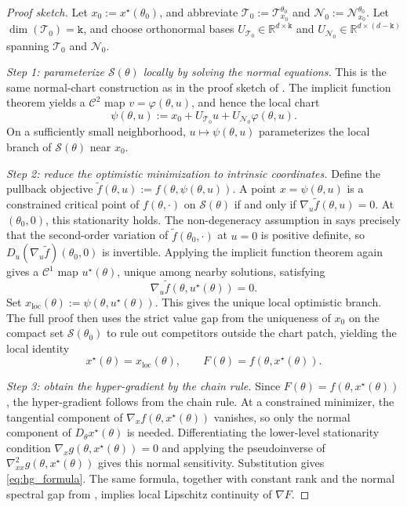 \documentclass{article}
\theoremstyle{normaltheorem}
\newcommand{\dimk}{\texttt{k}}
\newcommand{\R}{\mathbb{R}}
\newcommand{\calS}{\mathcal{S}}
\newcommand{\calT}{\mathcal{T}}
\newcommand{\calN}{\mathcal{N}}
\begin{document}
\begin{proof}[Proof sketch]
Let \(x_0:=x^\star(\theta_0)\), and abbreviate
\(\calT_0:=\calT_{x_0}^{\theta_0}\) and \(\calN_0:=\calN_{x_0}^{\theta_0}\).
Let \(\dim(\calT_0)=\dimk\), and choose orthonormal bases
\(U_{\calT_0}\in\R^{d\times\dimk}\) and
\(U_{\calN_0}\in\R^{d\times(d-\dimk)}\) spanning \(\calT_0\) and \(\calN_0\).

\smallskip\noindent
\emph{Step 1: parameterize \(\calS(\theta)\) locally by solving the normal equations.}
This is the same normal-chart construction as in the proof sketch of . The implicit function
theorem yields a \(\mathcal C^2\) map \(v=\varphi(\theta,u)\), and hence the local chart
\[
\psi(\theta,u):=x_0+U_{\calT_0}u+U_{\calN_0}\varphi(\theta,u).
\]
On a sufficiently small neighborhood, \(u\mapsto\psi(\theta,u)\) parameterizes the local branch of \(\calS(\theta)\)
near \(x_0\).

\smallskip\noindent
\emph{Step 2: reduce the optimistic minimization to intrinsic coordinates.}
Define the pullback objective \(\tilde f(\theta,u):=f(\theta,\psi(\theta,u))\). A point
\(x=\psi(\theta,u)\) is a constrained critical point of \(f(\theta,\cdot)\) on \(\calS(\theta)\) if and only if
\(\nabla_u\tilde f(\theta,u)=0\). At \((\theta_0,0)\), this stationarity holds. The non-degeneracy assumption in
 says precisely that the second-order variation of
\(\tilde f(\theta_0,\cdot)\) at \(u=0\) is positive definite, so
\(D_u(\nabla_u\tilde f)(\theta_0,0)\) is invertible. Applying the implicit function theorem again gives a
\(\mathcal C^1\) map \(u^\star(\theta)\), unique among nearby solutions, satisfying
\[
\nabla_u\tilde f(\theta,u^\star(\theta))=0.
\]
Set \(x_{\mathrm{loc}}(\theta):=\psi(\theta,u^\star(\theta))\). This gives the unique local optimistic branch. The full
proof then uses the strict value gap from the uniqueness of \(x_0\) on the compact set \(\calS(\theta_0)\) to rule out
competitors outside the chart patch, yielding the local identity
\[
x^\star(\theta)=x_{\mathrm{loc}}(\theta),
\qquad
F(\theta)=f(\theta,x^\star(\theta)).
\]

\smallskip\noindent
\emph{Step 3: obtain the hyper-gradient by the chain rule.}
Since \(F(\theta)=f(\theta,x^\star(\theta))\), the hyper-gradient follows from the chain rule. At a constrained minimizer,
the tangential component of \(\nabla_x f(\theta,x^\star(\theta))\) vanishes, so only the normal component of
\(D_\theta x^\star(\theta)\) is needed. Differentiating the lower-level stationarity condition
\(\nabla_x g(\theta,x^\star(\theta))=0\) and applying the pseudoinverse of
\(\nabla^2_{xx}g(\theta,x^\star(\theta))\) gives this normal sensitivity. Substitution gives
\eqref{eq:hg_formula}. The same formula, together with constant rank and the normal spectral gap from
, implies local Lipschitz continuity of \(\nabla F\).
\end{proof}
\end{document}
